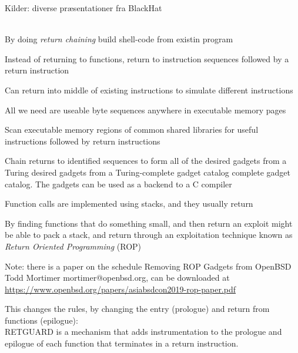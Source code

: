 \documentclass[Screen16to9,17pt]{foils}
\begin{document}
Kilder: diverse præsentationer fra BlackHat\\
\\
{\footnotesize{}}


\begin{list2}
\item By doing \emph{return chaining} build shell-code from existin program
\item Instead of returning to
functions, return to
instruction sequences
followed by a return
instruction

\item Can return into middle of
existing instructions to
simulate different
instructions

\item All we need are useable
byte sequences anywhere
in executable memory
pages
\item Scan executable memory regions of common shared
libraries for useful instructions followed by return
instructions
\item Chain returns to identified sequences to form all of the
desired gadgets from a Turing desired gadgets from
a Turing-complete gadget catalog complete gadget catalog. The gadgets can be used as a backend to a C compiler
\end{list2}

{\footnotesize{}}






\begin{list2}
\item Function calls are implemented using stacks, and they usually return
\item By finding functions that do something small, and then return an exploit might be able to pack a stack, and return through an exploitation technique known as \emph{Return Oriented Programming} (ROP)
\item Note: there is a paper on the schedule Removing ROP Gadgets from OpenBSD Todd Mortimer mortimer@openbsd.org, can be downloaded at\\ \url{https://www.openbsd.org/papers/asiabsdcon2019-rop-paper.pdf}
\item This changes the rules, by changing the entry (prologue) and return from functions (epilogue):\\
RETGUARD is a mechanism that adds instrumentation to the
prologue and epilogue of each function that terminates in a
return instruction.
\end{list2}


\slidenext{}
\end{document}
